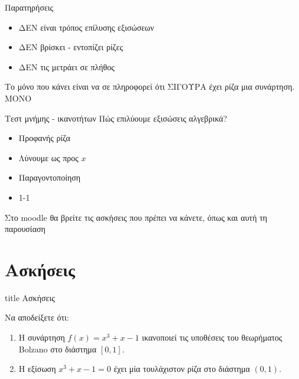 \documentclass{presentation}
\begin{document}
\begin{frame}{Παρατηρήσεις}
    \begin{itemize}
        \item<1-> ΔΕΝ είναι τρόπος επίλυσης εξισώσεων
        \item<2-> ΔΕΝ βρίσκει - εντοπίζει ρίζες
        \item<3-> ΔΕΝ τις μετράει σε πλήθος
    \end{itemize}
    Το μόνο που κάνει είναι να σε πληροφορεί ότι ΣΙΓΟΥΡΑ έχει ρίζα μια συνάρτηση.  ΜΟΝΟ
\end{frame}

\begin{frame}{Τεστ μνήμης - ικανοτήτων}
    Πώς επιλύουμε εξισώσεις αλγεβρικά?
    \begin{itemize}
        \item<1-> Προφανής ρίζα
        \item<2-> Λύνουμε ως προς $x$
        \item<3-> Παραγοντοποίηση
        \item<4-> 1-1
    \end{itemize}
\end{frame}

\begin{frame}[noframenumbering]
    Στο moodle θα βρείτε τις ασκήσεις που πρέπει να κάνετε, όπως και αυτή τη παρουσίαση
\end{frame}

\section{Ασκήσεις}

\begin{frame}[noframenumbering]
    \vfill
    \centering
    \begin{beamercolorbox}[sep=8pt,center,shadow=true,rounded=true]{title}
        Ασκήσεις
    \end{beamercolorbox}
    \vfill
\end{frame}

\begin{askisi}
    Να αποδείξετε ότι:
    \begin{enumerate}
        \item<1-> Η συνάρτηση $f(x)=x^3+x-1$ ικανοποιεί τις υποθέσεις του θεωρήματος Bolzano στο διάστημα $[0,1]$.
        \item<2-> Η εξίσωση $x^3+x-1=0$ έχει μία τουλάχιστον ρίζα στο διάστημα $(0,1)$.
    \end{enumerate}

\end{askisi}
\end{document}
